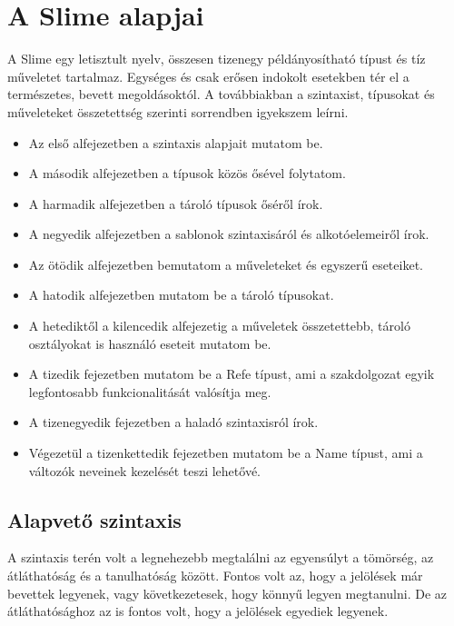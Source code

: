 \section{A Slime alapjai}
\label{sec:basics}
A Slime egy letisztult nyelv, összesen tizenegy példányosítható típust és tíz műveletet tartalmaz. 
Egységes és csak erősen indokolt esetekben tér el a természetes, bevett megoldásoktól.
A továbbiakban a szintaxist, típusokat és műveleteket összetettség szerinti sorrendben igyekszem leírni.
\begin{itemize}
\item Az első alfejezetben a szintaxis alapjait mutatom be.
\item A második alfejezetben a típusok közös ősével folytatom.
\item A harmadik alfejezetben a tároló típusok őséről írok.
\item A negyedik alfejezetben a sablonok szintaxisáról és alkotóelemeiről írok.
\item Az ötödik alfejezetben bemutatom a műveleteket és egyszerű eseteiket.
\item A hatodik alfejezetben mutatom be a tároló típusokat.
\item A hetediktől a kilencedik alfejezetig a műveletek összetettebb, tároló osztályokat is használó eseteit mutatom be.
\item A tizedik fejezetben mutatom be a Refe típust, ami a szakdolgozat egyik legfontosabb funkcionalitását valósítja meg.
\item A tizenegyedik fejezetben a haladó szintaxisról írok.
\item Végezetül a tizenkettedik fejezetben mutatom be a Name típust, ami a változók neveinek kezelését teszi lehetővé.
\end{itemize}
 

\subsection{Alapvető szintaxis}
\label{sec:SBaseSyntax}
A szintaxis terén volt a legnehezebb megtalálni az egyensúlyt a tömörség, az átláthatóság és a tanulhatóság között. 
Fontos volt az, hogy a jelölések már bevettek legyenek, vagy következetesek, hogy könnyű legyen megtanulni. 
De az átláthatósághoz az is fontos volt, hogy a jelölések egyediek legyenek.

